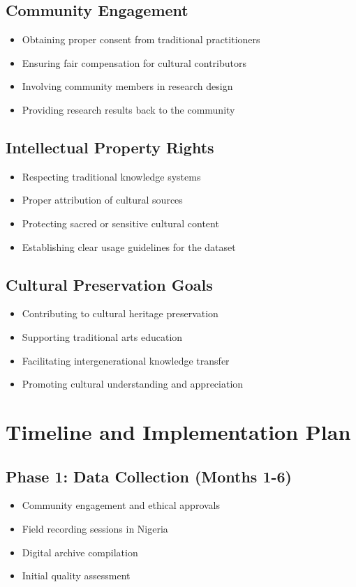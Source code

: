 \documentclass[12pt]{article}
\begin{document}
\subsection{Community Engagement}

\begin{itemize}
    \item Obtaining proper consent from traditional practitioners
    \item Ensuring fair compensation for cultural contributors
    \item Involving community members in research design
    \item Providing research results back to the community
\end{itemize}

\subsection{Intellectual Property Rights}

\begin{itemize}
    \item Respecting traditional knowledge systems
    \item Proper attribution of cultural sources
    \item Protecting sacred or sensitive cultural content
    \item Establishing clear usage guidelines for the dataset
\end{itemize}

\subsection{Cultural Preservation Goals}

\begin{itemize}
    \item Contributing to cultural heritage preservation
    \item Supporting traditional arts education
    \item Facilitating intergenerational knowledge transfer
    \item Promoting cultural understanding and appreciation
\end{itemize}

\section{Timeline and Implementation Plan}

\subsection{Phase 1: Data Collection (Months 1-6)}
\begin{itemize}
    \item Community engagement and ethical approvals
    \item Field recording sessions in Nigeria
    \item Digital archive compilation
    \item Initial quality assessment
\end{itemize}
\end{document}
